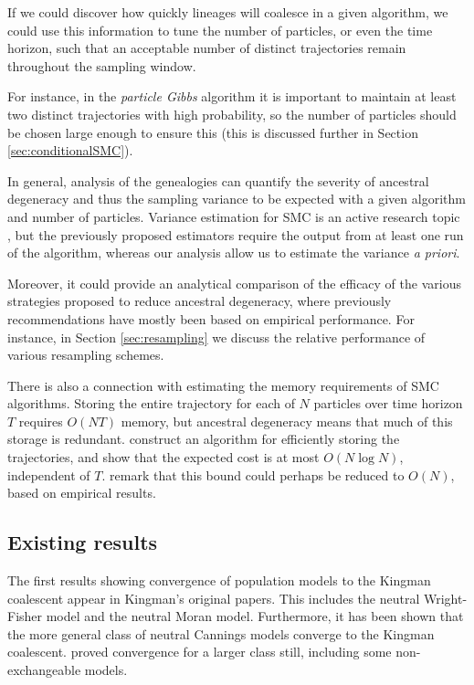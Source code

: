 \documentclass[fleqn]{article}
\theoremstyle{definition}
\begin{document}
If we could discover how quickly lineages will coalesce in a given algorithm, we could use this information to tune the number of particles, or even the time horizon, such that an acceptable number of distinct trajectories remain throughout the sampling window.

For instance, in the \emph{particle Gibbs} algorithm it is important to maintain at least two distinct trajectories with high probability, so the number of particles should be chosen large enough to ensure this (this is discussed further in Section \ref{sec:conditionalSMC}).

In general, analysis of the genealogies can quantify the severity of ancestral degeneracy and thus the sampling variance to be expected with a given algorithm and number of particles.
Variance estimation for SMC is an active research topic \citep{chan2013, lee2018, olsson2019}, but the previously proposed estimators require the output from at least one run of the algorithm, whereas our analysis allow us to estimate the variance \emph{a priori}.

Moreover, it could provide an analytical comparison of the efficacy of the various strategies proposed to reduce ancestral degeneracy, where previously recommendations have mostly been based on empirical performance. For instance, in Section \ref{sec:resampling} we discuss the relative performance of various resampling schemes.

There is also a connection with estimating the memory requirements of SMC algorithms. Storing the entire trajectory for each of $N$ particles over time horizon $T$ requires $O(NT)$ memory, but ancestral degeneracy means that much of this storage is redundant. 
\citet{jacob2015} construct an algorithm for efficiently storing the trajectories, and show that the expected cost is at most $O(N\log N)$, independent of $T$. \citet{koskela2018} remark that this bound could perhaps be reduced to $O(N)$, based on empirical results.

\subsection{Existing results}
The first results showing convergence of population models to the Kingman coalescent appear in Kingman's original papers. This includes the neutral Wright-Fisher model and the neutral Moran model.
Furthermore, it has been shown that the more general class of neutral Cannings models converge to the Kingman coalescent.
\citet{mohle1998} proved convergence for a larger class still, including some non-exchangeable models.
\end{document}
